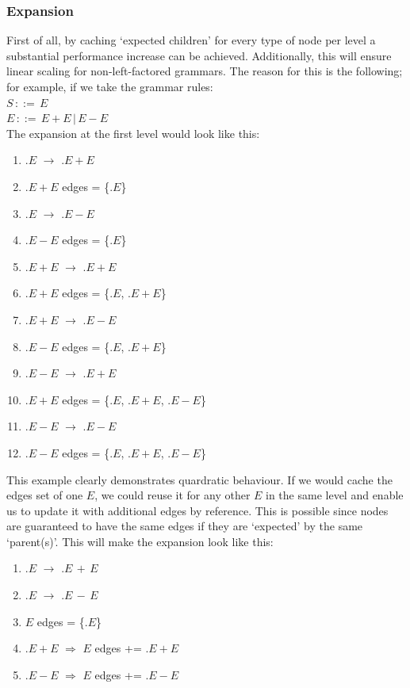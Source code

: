 \documentclass[a4paper,10pt]{article}
\begin{document}
\subsubsection{Expansion}
\label{subsec:nodeExpansionOptimization}
First of all, by caching `expected children' for every type of node per level a substantial performance increase can be achieved. Additionally, this will ensure linear scaling for non-left-factored grammars. The reason for this is the following; for example, if we take the grammar rules:\\
$S\,::=\,E$\\
$E\,::=\,E + E\,|\,E - E$\\
The expansion at the first level would look like this:
\begin{enumerate}
 \setlength{\itemsep}{0pt}
 \setlength{\parskip}{0pt}
 \setlength{\parsep}{0pt}
 
 \item $.E$ $\rightarrow$ $.E+E$
 \item $.E+E$ edges = \{$.E$\}
 \item $.E$ $\rightarrow$ $.E-E$
 \item $.E-E$ edges = \{$.E$\}
 \item $.E+E$ $\rightarrow$ $.E+E$
 \item $.E+E$ edges = \{$.E$, $.E+E$\}
 \item $.E+E$ $\rightarrow$ $.E-E$
 \item $.E-E$ edges = \{$.E$, $.E+E$\}
 \item $.E-E$ $\rightarrow$ $.E+E$
 \item $.E+E$ edges = \{$.E$, $.E+E$, $.E-E$\}
 \item $.E-E$ $\rightarrow$ $.E-E$
 \item $.E-E$ edges = \{$.E$, $.E+E$, $.E-E$\}
\end{enumerate}
This example clearly demonstrates quardratic behaviour. If we would cache the edges set of one $E$, we could reuse it for any other $E$ in the same level and enable us to update it with additional edges by reference. This is possible since nodes are guaranteed to have the same edges if they are `expected' by the same `parent(s)'. This will make the expansion look like this:
\begin{enumerate}
 \setlength{\itemsep}{0pt}
 \setlength{\parskip}{0pt}
 \setlength{\parsep}{0pt}
 
 \item $.E$ $\rightarrow$ $.E\,+\,E$
 \item $.E$ $\rightarrow$ $.E\,-\,E$
 \item $E$ edges = \{$.E$\}
 \item $.E+E$ $\Rightarrow$ $E$ edges += $.E+E$
 \item $.E-E$ $\Rightarrow$ $E$ edges += $.E-E$
\end{enumerate}
\end{document}
